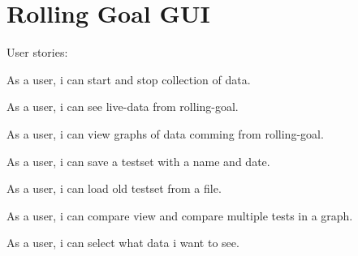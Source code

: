 \section{Rolling Goal GUI}
\label{sec:rollingroadgui}

User stories:

As a user, i can start and stop collection of data.

As a user, i can see live-data from rolling-goal.

As a user, i can view graphs of data comming from rolling-goal.

As a user, i can save a testset with a name and date.

As a user, i can load old testset from a file.

As a user, i can compare view and compare multiple tests in a graph.

As a user, i can select what data i want to see.